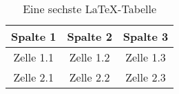 
\begin{table}[h!]
\begin{center}
\begin{tabular}{c|c|c}
\rowcolor{gray!50} Spalte 1      &   Spalte 2     &   Spalte 3     \\
\hline
Zelle 1.1                        &   Zelle 1.2    &   Zelle 1.3    \\
\hline
Zelle 2.1                        &   Zelle 2.2    &   Zelle 2.3    \\
\end{tabular}
\caption{Eine sechste LaTeX-Tabelle}
\end{center}
\end{table}

